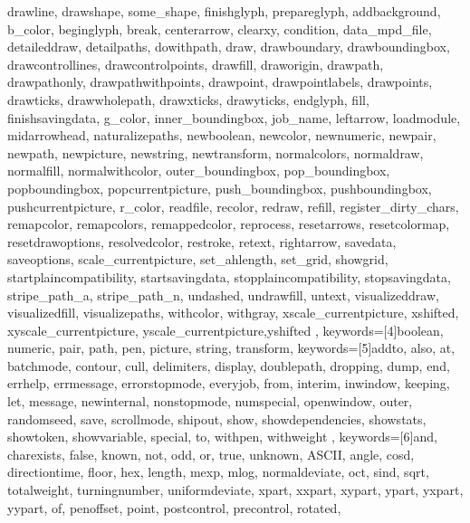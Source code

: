 {{        drawline, drawshape, some_shape,%
        finishglyph, prepareglyph,%
        addbackground, b_color, beginglyph, break, centerarrow,%
        clearxy, condition, data_mpd_file, detaileddraw,%
        detailpaths, dowithpath, draw, drawboundary,%
        drawboundingbox, drawcontrollines, drawcontrolpoints,%
        drawfill, draworigin, drawpath, drawpathonly,%
        drawpathwithpoints, drawpoint, drawpointlabels,%
        drawpoints, drawticks, drawwholepath, drawxticks,%
        drawyticks, endglyph, fill, finishsavingdata, g_color,%
        inner_boundingbox, job_name, leftarrow, loadmodule,%
        midarrowhead, naturalizepaths, newboolean, newcolor,%
        newnumeric, newpair, newpath, newpicture, newstring,%
        newtransform, normalcolors, normaldraw, normalfill,%
        normalwithcolor, outer_boundingbox, pop_boundingbox,%
        popboundingbox, popcurrentpicture, push_boundingbox,%
        pushboundingbox, pushcurrentpicture, r_color, readfile,%
        recolor, redraw, refill, register_dirty_chars,%
        remapcolor, remapcolors, remappedcolor, reprocess,%
        resetarrows, resetcolormap, resetdrawoptions,%
        resolvedcolor, restroke, retext, rightarrow, savedata,%
        saveoptions, scale_currentpicture, set_ahlength,%
        set_grid, showgrid, startplaincompatibility,%
        startsavingdata, stopplaincompatibility,%
        stopsavingdata, stripe_path_a, stripe_path_n, undashed,%
        undrawfill, untext, visualizeddraw, visualizedfill,%
        visualizepaths, withcolor, withgray,%
        xscale_currentpicture, xshifted,%
        xyscale_currentpicture, yscale_currentpicture,yshifted%
    },%
    keywords=[4]{boolean, numeric, pair, path, pen, picture, string, transform},%
    keywords=[5]{addto, also, at, batchmode, contour, cull, delimiters,%
        display, doublepath, dropping, dump, end, errhelp,%
        errmessage, errorstopmode, everyjob, from, interim,%
        inwindow, keeping, let, message, newinternal,%
        nonstopmode, numspecial, openwindow, outer, randomseed,%
        save, scrollmode, shipout, show, showdependencies,%
        showstats, showtoken, showvariable, special, to, withpen,%
        withweight
    }, %
    keywords=[6]{and, charexists, false, known, not, odd, or, true, unknown,%
        ASCII, angle, cosd, directiontime, floor, hex, length,%
        mexp, mlog, normaldeviate, oct, sind, sqrt, totalweight,%
        turningnumber, uniformdeviate, xpart, xxpart, xypart, ypart, yxpart, yypart,%
        of, penoffset, point, postcontrol, precontrol, rotated,%
}}
